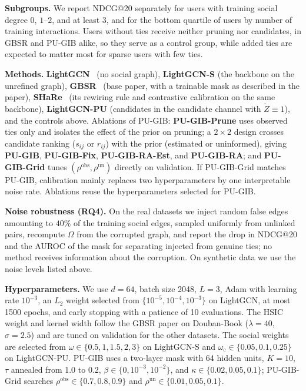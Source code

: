 \documentclass[sigconf]{acmart}
\begin{document}
\textbf{Subgroups.} We report NDCG@20 separately for users with training social degree $0$, $1$--$2$, and at least $3$, and for the bottom quartile of users by number of training interactions. Users without ties receive neither pruning nor candidates, in GBSR and PU-GIB alike, so they serve as a control group, while added ties are expected to matter most for sparse users with few ties.

\textbf{Methods.} \textbf{LightGCN}~\cite{10.1145/3397271.3401063} (no social graph), \textbf{LightGCN-S} (the backbone on the unrefined graph), \textbf{GBSR}~\cite{10.1145/3637528.3671807} (base paper, with a trainable mask as described in the paper), \textbf{SHaRe}~\cite{10.1145/3589334.3645460} (its rewiring rule and contrastive calibration on the same backbone), \textbf{LightGCN-PU} (candidates in the candidate channel with $\tilde{Z} \equiv 1$), and the controls above. Ablations of PU-GIB: \textbf{PU-GIB-Prune} uses observed ties only and isolates the effect of the prior on pruning; a $2 \times 2$ design crosses candidate ranking ($s_{ij}$ or $r_{ij}$) with the prior (estimated or uninformed), giving \textbf{PU-GIB}, \textbf{PU-GIB-Fix}, \textbf{PU-GIB-RA-Est}, and \textbf{PU-GIB-RA}; and \textbf{PU-GIB-Grid} tunes $(\rho^{\text{obs}}, \rho^{\text{un}})$ directly on validation. If PU-GIB-Grid matches PU-GIB, calibration mainly replaces two hyperparameters by one interpretable noise rate. Ablations reuse the hyperparameters selected for PU-GIB.

\textbf{Noise robustness (RQ4).} On the real datasets we inject random false edges amounting to $40\%$ of the training social edges, sampled uniformly from unlinked pairs, recompute $\Omega$ from the corrupted graph, and report the drop in NDCG@20 and the AUROC of the mask for separating injected from genuine ties; no method receives information about the corruption. On synthetic data we use the noise levels listed above.

\textbf{Hyperparameters.} We use $d = 64$, batch size 2048, $L = 3$, Adam with learning rate $10^{-3}$, an $L_2$ weight selected from $\{10^{-5}, 10^{-4}, 10^{-3}\}$ on LightGCN, at most 1500 epochs, and early stopping with a patience of 10 evaluations. The HSIC weight and kernel width follow the GBSR paper on Douban-Book ($\lambda = 40$, $\sigma = 2.5$) and are tuned on validation for the other datasets. The social weights are selected from $\omega \in \{0.5, 1, 1.5, 2, 3\}$ on LightGCN-S and $\omega_{\text{c}} \in \{0.05, 0.1, 0.25\}$ on LightGCN-PU. PU-GIB uses a two-layer mask with 64 hidden units, $K = 10$, $\tau$ annealed from 1.0 to 0.2, $\beta \in \{0, 10^{-3}, 10^{-2}\}$, and $\kappa \in \{0.02, 0.05, 0.1\}$; PU-GIB-Grid searches $\rho^{\text{obs}} \in \{0.7, 0.8, 0.9\}$ and $\rho^{\text{un}} \in \{0.01, 0.05, 0.1\}$.
\end{document}
